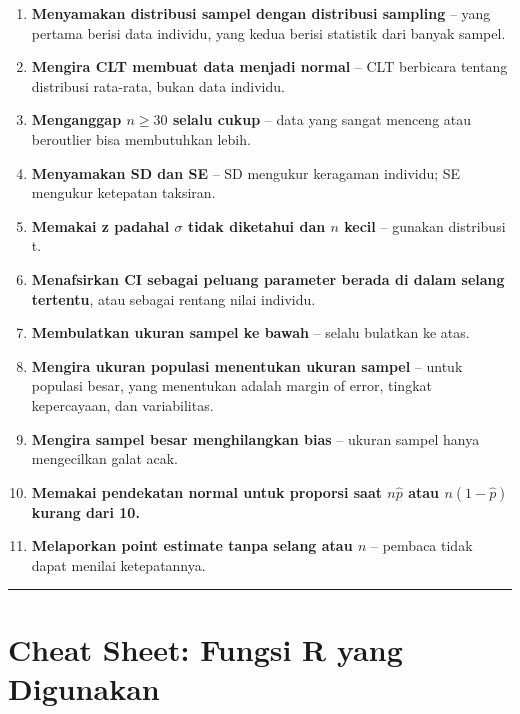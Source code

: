 \documentclass[
  indonesian,
  letterpaper,
]{book}
\providecommand{\tightlist}{%
  \setlength{\itemsep}{0pt}\setlength{\parskip}{0pt}}
\begin{document}
\begin{enumerate}
\def\labelenumi{\arabic{enumi}.}
\tightlist
\item
  \textbf{Menyamakan distribusi sampel dengan distribusi sampling} --
  yang pertama berisi data individu, yang kedua berisi statistik dari
  banyak sampel.
\item
  \textbf{Mengira CLT membuat data menjadi normal} -- CLT berbicara
  tentang distribusi rata-rata, bukan data individu.
\item
  \textbf{Menganggap \(n \geq 30\) selalu cukup} -- data yang sangat
  menceng atau beroutlier bisa membutuhkan lebih.
\item
  \textbf{Menyamakan SD dan SE} -- SD mengukur keragaman individu; SE
  mengukur ketepatan taksiran.
\item
  \textbf{Memakai z padahal \(\sigma\) tidak diketahui dan \(n\) kecil}
  -- gunakan distribusi t.
\item
  \textbf{Menafsirkan CI sebagai peluang parameter berada di dalam
  selang tertentu}, atau sebagai rentang nilai individu.
\item
  \textbf{Membulatkan ukuran sampel ke bawah} -- selalu bulatkan ke
  atas.
\item
  \textbf{Mengira ukuran populasi menentukan ukuran sampel} -- untuk
  populasi besar, yang menentukan adalah margin of error, tingkat
  kepercayaan, dan variabilitas.
\item
  \textbf{Mengira sampel besar menghilangkan bias} -- ukuran sampel
  hanya mengecilkan galat acak.
\item
  \textbf{Memakai pendekatan normal untuk proporsi saat \(n\hat{p}\)
  atau \(n(1-\hat{p})\) kurang dari 10.}
\item
  \textbf{Melaporkan point estimate tanpa selang atau \(n\)} -- pembaca
  tidak dapat menilai ketepatannya.
\end{enumerate}

\begin{center}\rule{0.5\linewidth}{0.5pt}\end{center}


\chapter{Cheat Sheet: Fungsi R yang
Digunakan}\label{cheat-sheet-fungsi-r-yang-digunakan}
\end{document}
